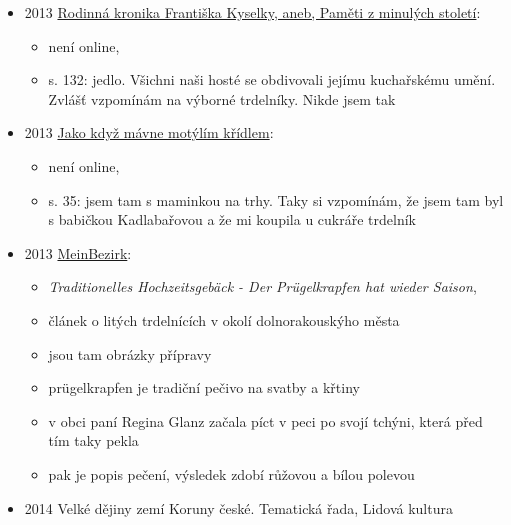 \begin{itemize}
  \begin{itemize}
  \tightlist
  \item
    č. 1-2, s. 197
  \item
    \emph{Odraz tradice a její nositelé v současných výrobách na
    Moravě}, 
  \item
    část řemeslníků se zaměřuje na tradiční potravinářské produkty, jako
    perníky, štramberské uši, frgály, pagáče, medovina, v poslední době
    též populární trdelníky
  \end{itemize}
\item
  2013
  \href{https://www.digitalniknihovna.cz/mzk/uuid/uuid:d42facc0-e157-11ea-87fa-005056827e52}{Rodinná
  kronika Františka Kyselky, aneb, Paměti z minulých století}:

  \begin{itemize}
  \tightlist
  \item
    není online, 
  \item
    s. 132: jedlo. Všichni naši hosté se obdivovali jejímu kuchařskému
    umění. Zvlášť vzpomínám na výborné trdelníky. Nikde jsem tak
  \end{itemize}
\item
  2013
  \href{https://www.digitalniknihovna.cz/mzk/uuid/uuid:c796d2d0-ccc7-11ea-9c41-005056827e52}{Jako
  když mávne motýlím křídlem}:

  \begin{itemize}
  \tightlist
  \item
    není online, 
  \item
    s. 35: jsem tam s maminkou na trhy. Taky si vzpomínám, že jsem tam
    byl s babičkou Kadlabařovou a že mi koupila u cukráře trdelník
  \end{itemize}
\item
  2013
  \href{https://www.meinbezirk.at/horn/c-lokales/traditionelles-hochzeitsgebaeck-der-pruegelkrapfen-hat-wieder-saison_a617487\#gallery=null}{MeinBezirk}:

  \begin{itemize}
  \tightlist
  \item
    \emph{Traditionelles Hochzeitsgebäck - Der Prügelkrapfen hat wieder
    Saison},  
  \item
    článek o litých trdelnících v okolí dolnorakouskýho města
  \item
    jsou tam obrázky přípravy
  \item
    prügelkrapfen je tradiční pečivo na svatby a křtiny
  \item
    v obci  paní Regina Glanz začala píct v peci po
    svojí tchýni, která před tím taky pekla
  \item
    pak je popis pečení, výsledek zdobí růžovou a bílou polevou
  \end{itemize}
\item
  2014 Velké dějiny zemí Koruny české. Tematická řada, Lidová kultura


\end{itemize}
